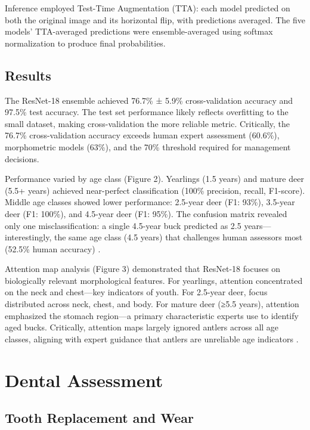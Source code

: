 \documentclass[11pt]{article}
\begin{document}
Inference employed Test-Time Augmentation (TTA): each model predicted on both the original image and its horizontal flip, with predictions averaged. The five models' TTA-averaged predictions were ensemble-averaged using softmax normalization to produce final probabilities.

\subsection{Results}

The ResNet-18 ensemble achieved 76.7\% ± 5.9\% cross-validation accuracy and 97.5\% test accuracy. The test set performance likely reflects overfitting to the small dataset, making cross-validation the more reliable metric. Critically, the 76.7\% cross-validation accuracy exceeds human expert assessment (60.6\%), morphometric models (63\%), and the 70\% threshold required for management decisions.

Performance varied by age class (Figure 2). Yearlings (1.5 years) and mature deer (5.5+ years) achieved near-perfect classification (100\% precision, recall, F1-score). Middle age classes showed lower performance: 2.5-year deer (F1: 93\%), 3.5-year deer (F1: 100\%), and 4.5-year deer (F1: 95\%). The confusion matrix revealed only one misclassification: a single 4.5-year buck predicted as 2.5 years—interestingly, the same age class (4.5 years) that challenges human assessors most (52.5\% human accuracy) \cite{gee2013accuracy}.

Attention map analysis (Figure 3) demonstrated that ResNet-18 focuses on biologically relevant morphological features. For yearlings, attention concentrated on the neck and chest—key indicators of youth. For 2.5-year deer, focus distributed across neck, chest, and body. For mature deer (≥5.5 years), attention emphasized the stomach region—a primary characteristic experts use to identify aged bucks. Critically, attention maps largely ignored antlers across all age classes, aligning with expert guidance that antlers are unreliable age indicators \cite{demarais1999hunter, richards2003observing}.

\section{Dental Assessment}

\subsection{Tooth Replacement and Wear}
\end{document}
